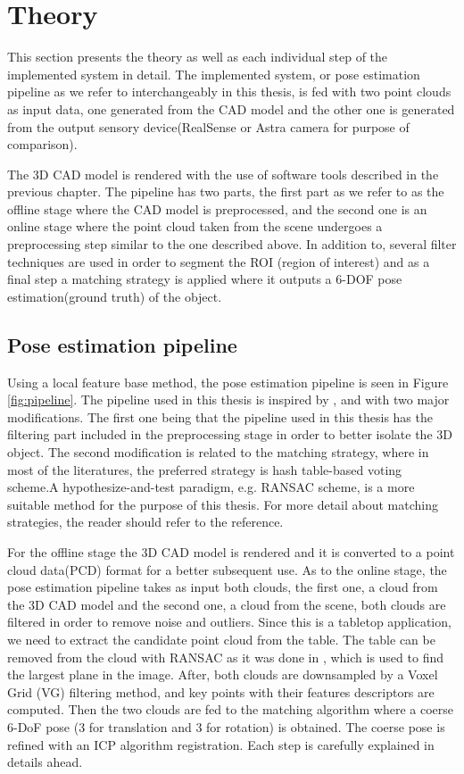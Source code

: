 
\chapter{Theory}
\label{chap:theo}
This section presents the theory as well as each individual step of the implemented system in detail. The implemented system, or pose estimation pipeline as we refer to interchangeably in this thesis, is fed with two point clouds as input data, one generated from the CAD model and the other one is generated from the output sensory device(RealSense or Astra camera for purpose of comparison).

The 3D CAD model is rendered with the use of software tools described in the previous chapter. The pipeline has two parts, the first part as we refer to as the offline stage where the CAD model is preprocessed, and the second one is an online stage where the point cloud taken from the scene undergoes a preprocessing step similar to the one described above. In addition to, several filter techniques are used in order to segment the ROI (region of interest) and as a final step a matching strategy is applied where it outputs a 6-DOF pose estimation(ground truth) of the object.  

\section{Pose estimation pipeline}
Using a local feature base method, the pose estimation pipeline is seen in Figure \ref{fig:pipeline}. The pipeline used in this thesis is inspired by \cite{cadPipeline1}, \cite{cadPipeline2} and \cite{cadPipeline3} with two major modifications. The first one being that the pipeline used in this thesis has the filtering part included in the preprocessing stage in order to better isolate the 3D object. The second modification is related to the matching strategy\cite{repMatching}, where in most of the literatures, the preferred strategy is hash table-based voting scheme.A hypothesize-and-test paradigm\cite{repMatching}, e.g. RANSAC scheme, is a more suitable method for the purpose of this thesis. For more detail about matching strategies, the reader should refer to the reference. 

For the offline stage the 3D CAD model is rendered and it is converted to a point cloud data(PCD) format for a better subsequent use. As to the online stage, the pose estimation pipeline takes as input both clouds, the first one, a cloud from the 3D CAD model and the second one, a cloud from the scene, both clouds are filtered in order to remove noise and outliers. Since this is a tabletop application, we need to extract the candidate point cloud from the table. The table can be removed from the cloud with RANSAC as it was done in \cite{cadPipeline3}, which is used to find the largest plane in the image. After, both clouds are downsampled by a Voxel Grid (VG) filtering method, and key points with their features descriptors are computed. Then the two clouds are fed to the matching algorithm where a coerse 6-DoF pose (3 for translation and 3 for rotation) is obtained. The coerse pose is refined with an ICP algorithm registration. Each step is carefully explained in details ahead. 

